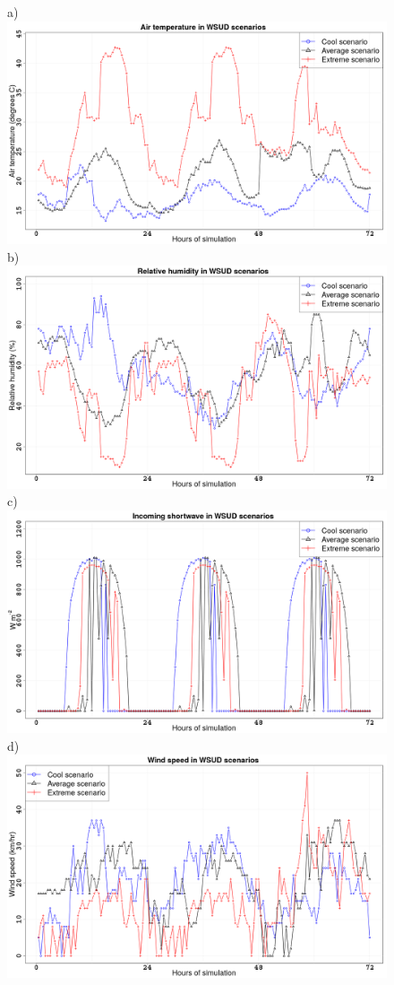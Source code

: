 \documentclass[final,3p,times,authoryear]{elsarticle}
\begin{document}
\begin{figure}[!htbp]
\centering   
a)\includegraphics[scale=0.14]{images/Ta.png}
b)\includegraphics[scale=0.14]{images/RH.png}
\\
c)\includegraphics[scale=0.14]{images/Kd.png}
d)\includegraphics[scale=0.14]{images/WS.png}


\end{figure}
\end{document}
